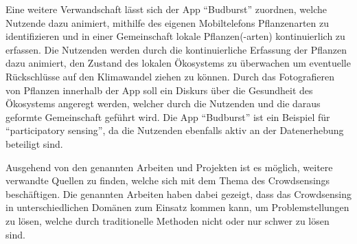 Eine weitere Verwandschaft lässt sich der App \enquote{Budburst} zuordnen, welche Nutzende dazu animiert, mithilfe des eigenen Mobiltelefons Pflanzenarten zu identifizieren und in einer Gemeinschaft lokale Pflanzen(-arten) kontinuierlich zu erfassen. Die Nutzenden werden durch die kontinuierliche Erfassung der Pflanzen dazu animiert, den Zustand des lokalen Ökosystems zu 
überwachen um eventuelle Rückschlüsse auf den Klimawandel ziehen zu können. Durch das Fotografieren von Pflanzen innerhalb der App soll ein Diskurs über die Gesundheit des Ökosystems angeregt werden, welcher durch die Nutzenden und die daraus geformte Gemeinschaft geführt wird. Die App \enquote{Budburst} ist ein Beispiel für \enquote{participatory sensing}, da die Nutzenden ebenfalls aktiv an der Datenerhebung 
beteiligt sind.

Ausgehend von den genannten Arbeiten und Projekten ist es möglich, weitere verwandte Quellen zu finden, welche sich mit dem Thema des Crowdsensings beschäftigen. Die genannten Arbeiten haben dabei gezeigt, dass das Crowdsensing in unterschiedlichen Domänen zum Einsatz kommen kann, um Problemstellungen zu lösen, welche durch traditionelle Methoden nicht oder nur schwer zu lösen sind.